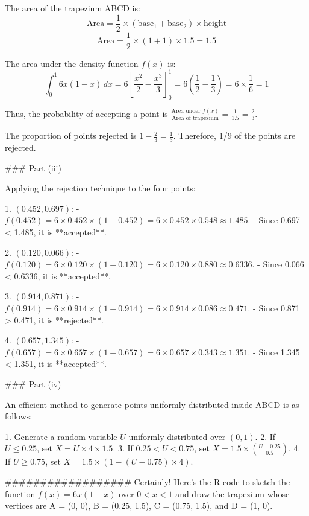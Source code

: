 The area of the trapezium ABCD is:
\[ \text{Area} = \frac{1}{2} \times (\text{base}_1 + \text{base}_2) \times \text{height} \]
\[ \text{Area} = \frac{1}{2} \times (1 + 1) \times 1.5 = 1.5 \]

The area under the density function \( f(x) \) is:
\[ \int_0^1 6x(1-x) \, dx = 6 \left[ \frac{x^2}{2} - \frac{x^3}{3} \right]_0^1 = 6 \left( \frac{1}{2} - \frac{1}{3} \right) = 6 \times \frac{1}{6} = 1 \]

Thus, the probability of accepting a point is \( \frac{\text{Area under } f(x)}{\text{Area of trapezium}} = \frac{1}{1.5} = \frac{2}{3} \).

The proportion of points rejected is \( 1 - \frac{2}{3} = \frac{1}{3} \). Therefore, 1/9 of the points are rejected.

### Part (iii)

Applying the rejection technique to the four points:

1. \( (0.452, 0.697) \):
   - \( f(0.452) = 6 \times 0.452 \times (1 - 0.452) = 6 \times 0.452 \times 0.548 \approx 1.485 \).
   - Since 0.697 < 1.485, it is **accepted**.

2. \( (0.120, 0.066) \):
   - \( f(0.120) = 6 \times 0.120 \times (1 - 0.120) = 6 \times 0.120 \times 0.880 \approx 0.6336 \).
   - Since 0.066 < 0.6336, it is **accepted**.

3. \( (0.914, 0.871) \):
   - \( f(0.914) = 6 \times 0.914 \times (1 - 0.914) = 6 \times 0.914 \times 0.086 \approx 0.471 \).
   - Since 0.871 > 0.471, it is **rejected**.

4. \( (0.657, 1.345) \):
   - \( f(0.657) = 6 \times 0.657 \times (1 - 0.657) = 6 \times 0.657 \times 0.343 \approx 1.351 \).
   - Since 1.345 < 1.351, it is **accepted**.

### Part (iv)

An efficient method to generate points uniformly distributed inside ABCD is as follows:

1. Generate a random variable \( U \) uniformly distributed over \( (0,1) \).
2. If \( U \leq 0.25 \), set \( X = U \times 4 \times 1.5 \).
3. If \( 0.25 < U < 0.75 \), set \( X = 1.5 \times \left(\frac{U - 0.25}{0.5} \right) \).
4. If \( U \geq 0.75 \), set \( X = 1.5 \times (1 - (U - 0.75) \times 4) \).


##################
Certainly! Here's the R code to sketch the function \( f(x) = 6x(1-x) \) over \( 0 < x < 1 \) and draw the trapezium whose vertices are A = (0, 0), B = (0.25, 1.5), C = (0.75, 1.5), and D = (1, 0).

